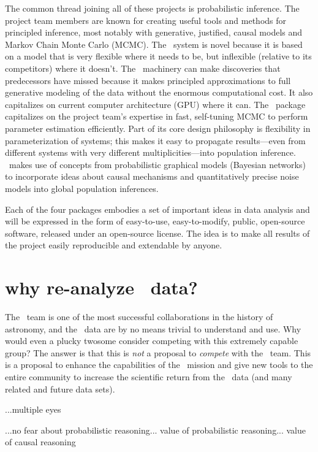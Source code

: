 \documentclass[letterpaper,12pt]{article}
\newcommand{\Untrendy}{\package{Untrendy}}
\newcommand{\Turnstyle}{\package{Turnstyle}}
\newcommand{\Bart}{\package{Bart}}
\newcommand{\TheCreator}{\package{The~Creator}}
\begin{document}
The common thread joining all of these projects is probabilistic
inference.  The project team members are known for creating useful
tools and methods for principled inference, most notably with
generative, justified, causal models and Markov Chain Monte Carlo
(MCMC).  The \Untrendy\ system is novel because it is based on a model
that is very flexible where it needs to be, but inflexible (relative
to its competitors) where it doesn't.  The \Turnstyle\ machinery can
make discoveries that predecessors have missed because it makes
principled approximations to full generative modeling of the data
without the enormous computational cost.  It also capitalizes on
current computer architecture (GPU) where it can.  The \Bart\ package
capitalizes on the project team's expertise in fast, self-tuning MCMC
to perform parameter estimation efficiently.  Part of its core design
philosophy is flexibility in parameterization of systems; this makes
it easy to propagate results---even from different systems with very
different multiplicities---into population inference.
\TheCreator\ makes use of concepts from probabilistic graphical models
(Bayesian networks) to incorporate ideas about causal mechanisms and
quantitatively precise noise models into global population inferences.

Each of the four packages embodies a set of important ideas in data
analysis and will be expressed in the form of easy-to-use,
easy-to-modify, public, open-source software, released under an
open-source license.  The idea is to make all results of the project
easily reproducible and extendable by anyone.

\section{why re-analyze \Kepler\ data?}

The \Kepler\ team is one of the most successful collaborations in the
history of astronomy, and the \Kepler\ data are by no means trivial to
understand and use.  Why would even a plucky twosome consider
competing with this extremely capable group?  The answer is that this
is \emph{not} a proposal to \emph{compete} with the \Kepler\ team.
This is a proposal to enhance the capabilities of the \Kepler\ mission
and give new tools to the entire community to increase the scientific
return from the \Kepler\ data (and many related and future data sets).

...multiple eyes

...no fear about probabilistic reasoning... value of probabilistic reasoning... value of causal reasoning
\end{document}
